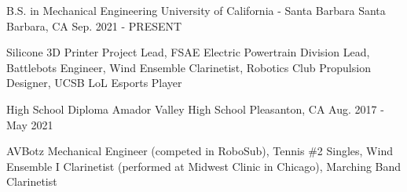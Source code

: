 


\begin{cventries}

\cventry
{B.S. in Mechanical Engineering} %
{University of California - Santa Barbara} %
{Santa Barbara, CA} %
{Sep. 2021 - PRESENT} %
{ %
\begin{cvitems}
\item {Silicone 3D Printer Project Lead, FSAE Electric Powertrain Division Lead, Battlebots Engineer, Wind Ensemble Clarinetist, Robotics Club Propulsion Designer, UCSB LoL Esports Player}
\end{cvitems}
}

\cventry
{High School Diploma} %
{Amador Valley High School} %
{Pleasanton, CA} %
{Aug. 2017 - May 2021} %
{ %
\begin{cvitems}
\item{AVBotz Mechanical Engineer (competed in RoboSub), Tennis \#2 Singles, Wind Ensemble I Clarinetist (performed at Midwest Clinic in Chicago), Marching Band Clarinetist}
\end{cvitems}
}




\end{cventries}